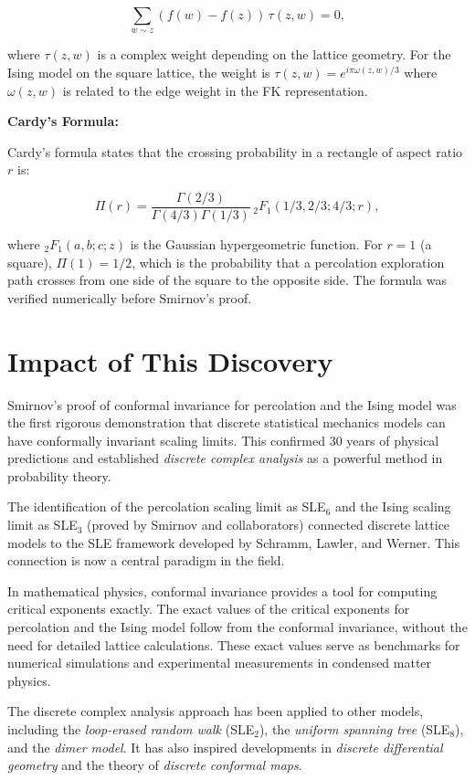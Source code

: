 \[
\sum_{w \sim z} (f(w) - f(z)) \, \tau(z,w) = 0,
\]

where $\tau(z,w)$ is a complex weight depending on the lattice geometry. For the Ising model on the square lattice, the weight is $\tau(z,w) = e^{i\pi \omega(z,w)/3}$ where $\omega(z,w)$ is related to the edge weight in the FK representation.

\textbf{Cardy's Formula:}

Cardy's formula states that the crossing probability in a rectangle of aspect ratio $r$ is:

\[
\Pi(r) = \frac{\Gamma(2/3)}{\Gamma(4/3)\Gamma(1/3)} \, {}_2F_1(1/3, 2/3; 4/3; r),
\]

where ${}_2F_1(a,b;c;z)$ is the Gaussian hypergeometric function. For $r=1$ (a square), $\Pi(1) = 1/2$, which is the probability that a percolation exploration path crosses from one side of the square to the opposite side. The formula was verified numerically before Smirnov's proof.

\section{Impact of This Discovery}\label{ch2010stanislavsmirnov:impact-of-this-discovery}

Smirnov's proof of conformal invariance for percolation and the Ising model was the first rigorous demonstration that discrete statistical mechanics models can have conformally invariant scaling limits. This confirmed 30 years of physical predictions and established \emph{discrete complex analysis} as a powerful method in probability theory.

The identification of the percolation scaling limit as SLE$_6$ and the Ising scaling limit as SLE$_3$ (proved by Smirnov and collaborators) connected discrete lattice models to the SLE framework developed by Schramm, Lawler, and Werner. This connection is now a central paradigm in the field.

In mathematical physics, conformal invariance provides a tool for computing critical exponents exactly. The exact values of the critical exponents for percolation and the Ising model follow from the conformal invariance, without the need for detailed lattice calculations. These exact values serve as benchmarks for numerical simulations and experimental measurements in condensed matter physics.

The discrete complex analysis approach has been applied to other models, including the \emph{loop-erased random walk} (SLE$_2$), the \emph{uniform spanning tree} (SLE$_8$), and the \emph{dimer model}. It has also inspired developments in \emph{discrete differential geometry} and the theory of \emph{discrete conformal maps}.

